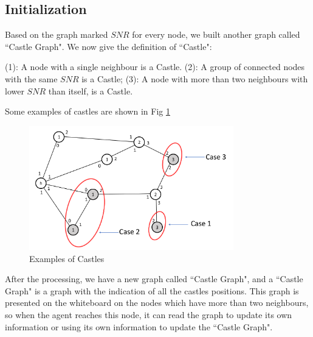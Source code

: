 \subsection{ Initialization}
Based on the graph marked $SNR$ for every node, we built another graph called ``Castle Graph". 
We now give the definition of ``Castle":
\begin{definition}
\noindent (1): A node with a single neighbour is a Castle.
\noindent (2): A group of connected nodes with the same $SNR$  is a Castle;
\noindent (3): A node with more than two neighbours with lower $SNR$ than itself, is  a Castle.
\end{definition}
 

Some examples of castles are shown in Fig  \ref{fig:CastleExample}
\begin{figure}[H]
  \centering  
  \includegraphics[width=3.5in]{figures/CastleExample.png}
  \caption{Examples of Castles}\label{fig:CastleExample}
\end{figure} 

After the processing, we have a new graph called ``Castle Graph", and a ``Castle Graph" is a graph with the indication of all the castles positions. This graph is presented on the whiteboard on the nodes which have more than two neighbours, so when the agent reaches this node, it can read the graph to update its own information or using its own information to update the ``Castle Graph". 


